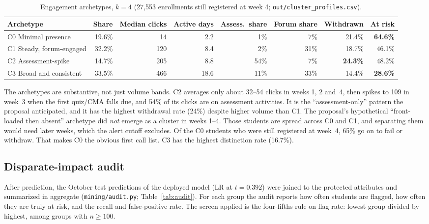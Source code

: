 \documentclass[10pt,letterpaper]{article}
\renewcommand{\tt}[1]{\texttt{#1}}
\begin{document}
\begin{table}[H]\centering\small
\caption{Engagement archetypes, $k=4$ (27,553 enrollments still registered at week 4; \tt{out/cluster\_profiles.csv}).}\label{tab:clu}
\begin{tabular}{@{}p{3.1cm}rrrrrrr@{}}
\toprule
\textbf{Archetype} & \textbf{Share} & \textbf{Median clicks} & \textbf{Active days} & \textbf{Assess.\ share} & \textbf{Forum share} & \textbf{Withdrawn} & \textbf{At risk} \\ \midrule
C0 Minimal presence & 19.6\% & 14 & 2.2 & 1\% & 7\% & 21.4\% & \textbf{64.6\%} \\
C1 Steady, forum-engaged & 32.2\% & 120 & 8.4 & 2\% & 31\% & 18.7\% & 46.1\% \\
C2 Assessment-spike & 14.7\% & 205 & 8.8 & 54\% & 7\% & \textbf{24.3\%} & 48.2\% \\
C3 Broad and consistent & 33.5\% & 466 & 18.6 & 11\% & 33\% & 14.4\% & \textbf{28.6\%} \\
\bottomrule
\end{tabular}
\end{table}
The archetypes are substantive, not just volume bands. C2 averages only about 32--54 clicks in weeks 1, 2 and~4,
then spikes to 109 in week~3 when the first quiz/CMA falls due, and 54\% of its clicks are on assessment
activities. It is the ``assessment-only'' pattern the proposal anticipated, and it has the highest withdrawal rate
(24\%) despite higher volume than C1. The proposal's hypothetical ``front-loaded then absent'' archetype did
\emph{not} emerge as a cluster in weeks 1--4. Those students are spread across C0 and C1, and separating them
would need later weeks, which the alert cutoff excludes. Of the C0 students who were still registered at week~4,
65\% go on to fail or withdraw. That makes C0 the obvious first call list. C3 has the highest distinction rate
(16.7\%).

\subsection{Disparate-impact audit}
After prediction, the October test predictions of the deployed model (LR at $t=0.392$) were joined to the
protected attributes and summarized in aggregate (\tt{mining/audit.py}; Table~\ref{tab:audit}). For each group the
audit reports how often students are flagged, how often they are truly at risk, and the recall and false-positive
rate. The screen applied is the four-fifths rule on flag rate: lowest group divided by highest, among groups with
$n \ge 100$.
\end{document}
